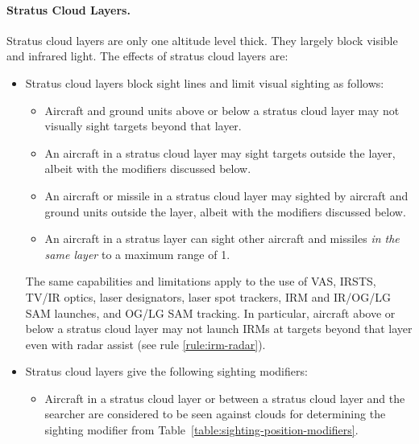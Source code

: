 \begin{advancedrules}
{\paragraph{Stratus Cloud Layers.}
\label{rule:stratus-cloud-layers}
Stratus cloud layers are only one altitude level thick. They largely block visible and infrared light. The effects of stratus cloud layers are:

\begin{itemize}

\item{} Stratus cloud layers block sight lines and limit visual sighting as follows:

\begin{itemize}
\item
Aircraft and ground units above or below a stratus cloud layer may not visually sight targets beyond that layer.

\item An aircraft in a stratus cloud layer may sight targets outside the layer, albeit with the modifiers discussed below.

\item An aircraft or missile in a stratus cloud layer may sighted by aircraft and ground units outside the layer, albeit with the modifiers discussed below.

\item An aircraft in a stratus layer can sight other aircraft and missiles \emph{in the same layer} to a maximum range of 1.
\end{itemize}

The same capabilities and limitations apply to the use of VAS, IRSTS, TV/IR optics, laser designators, laser spot trackers, IRM and IR/OG/LG SAM launches, and OG/LG SAM tracking. In particular, aircraft above or below a stratus cloud layer may not launch IRMs at targets beyond that layer even with radar assist (see rule \ref{rule:irm-radar}).

\item{} Stratus cloud layers give the following sighting modifiers:
\begin{itemize}

\item Aircraft in a stratus cloud layer or between a stratus cloud layer and the searcher are considered to be seen against clouds for determining the sighting modifier from Table~\ref{table:sighting-position-modifiers}.


\end{itemize}
\end{itemize}}
\end{advancedrules}
